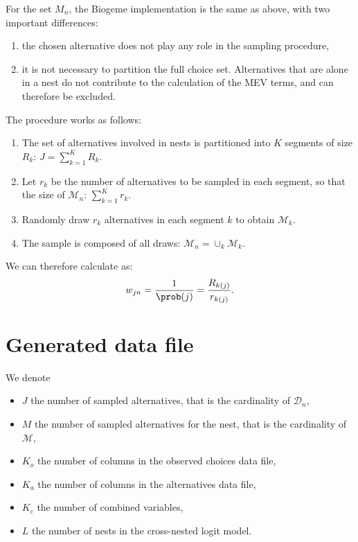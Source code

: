 \documentclass[12pt,a4paper]{article}
\begin{document}
For the set $M_n$, the Biogeme implementation is the same as above, with two important differences:
\begin{enumerate}
\item the chosen alternative does not play any role in the sampling procedure,
\item it is not necessary to partition the full choice
  set. Alternatives that are alone in a nest do not contribute to
  the calculation of the MEV terms, and can therefore be excluded.
\end{enumerate}

The procedure works as follows:
\begin{enumerate}
  \item The set of alternatives involved in nests is partitioned into $K$ segments of size $R_k$: $J=\sum_{k=1}^K R_k$.
  \item Let $r_k$ be the number of alternatives to be sampled in each segment, so that the size of $\mathcal{M}_n$: $\sum_{k=1}^K r_k$.
  \item Randomly draw $r_k$ alternatives in each segment $k$ to obtain $\mathcal{M}_k$.
  \item The sample is composed of  all draws: $\mathcal{M}_n = \cup_k \mathcal{M}_k$.
\end{enumerate}

We can therefore calculate  as:
\begin{equation}
  \label{eq:weight_mev}
    w_{jn} = \frac{1}{\prob(j)} = \frac{R_{k(j)}}{r_{k(j)}}.
\end{equation}

\section{Generated data file}
\label{sec:biogeme_data}
We denote
\begin{itemize}
\item $J$ the number of sampled alternatives, that is the cardinality of $\mathcal{D}_n$,
\item $M$ the number of sampled alternatives for the nest, that is the cardinality of $\mathcal{M}$,
\item $K_o$ the number of columns in the observed choices data file,
\item $K_a$ the number of columns in the alternatives data file,
\item $K_c$ the number of combined variables,
\item $L$ the number of nests in the cross-nested logit model.
\end{itemize}
\end{document}
